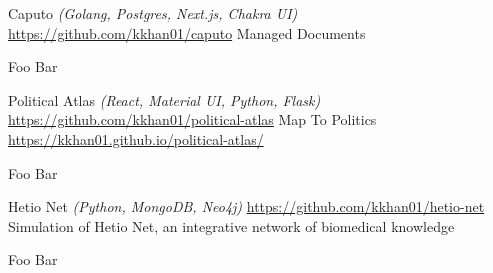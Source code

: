 

\begin{cventries}

  \cventryproject
    {Caputo} %
    {\emph{(Golang, Postgres, Next.js, Chakra UI)}}
    {\href{https://github.com/kkhan01/caputo}{https://github.com/kkhan01/caputo}} %
    {Managed Documents} %
    {
      \begin{cvitems} %
        \item {Foo Bar}
      \end{cvitems}
    }

\cventryproject
    {Political Atlas} %
    {\emph{(React, Material UI, Python, Flask)}}
    {\href{https://github.com/kkhan01/political-atlas}{https://github.com/kkhan01/political-atlas}} %
    {Map To Politics \href{https://kkhan01.github.io/political-atlas/}{https://kkhan01.github.io/political-atlas/}} %
    {
      \begin{cvitems} %
        \item {Foo Bar}
      \end{cvitems}
    }

\cventryproject
    {Hetio Net} %
    {\emph{(Python, MongoDB, Neo4j)}}
    {\href{https://github.com/kkhan01/hetio-net}{https://github.com/kkhan01/hetio-net}} %
    {Simulation of Hetio Net, an integrative network of biomedical knowledge} %
    {
      \begin{cvitems} %
        \item {Foo Bar}
      \end{cvitems}
    }
\end{cventries}
